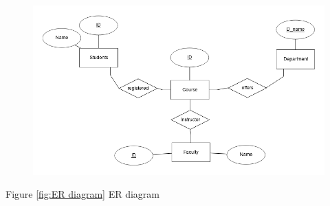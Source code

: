 \documentclass{article}
\begin{document}
\begin{figure}[]
\includegraphics[scale=0.5]{university_ER.png}
\end{figure}

Figure \ref{fig:ER diagram} ER diagram
\end{document}
